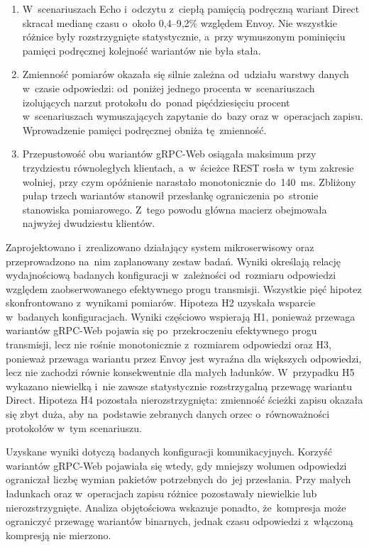 \begin{enumerate}
\item W~scenariuszach Echo i~odczytu z~ciepłą pamięcią podręczną wariant Direct skracał medianę czasu o~około 0,4--9,2\% względem Envoy. Nie wszystkie różnice były rozstrzygnięte statystycznie, a~przy wymuszonym pominięciu pamięci podręcznej kolejność wariantów nie była stała.

\item Zmienność pomiarów okazała się silnie zależna od~udziału warstwy danych w~czasie odpowiedzi: od~poniżej jednego procenta w~scenariuszach izolujących narzut protokołu do~ponad pięćdziesięciu procent w~scenariuszach wymuszających zapytanie do~bazy oraz w~operacjach zapisu. Wprowadzenie pamięci podręcznej obniża tę~zmienność.

\item Przepustowość obu wariantów gRPC-Web osiągała maksimum przy trzydziestu równoległych klientach, a~w~ścieżce REST rosła w~tym zakresie wolniej, przy czym opóźnienie narastało monotonicznie do~140~ms. Zbliżony pułap trzech wariantów stanowił przesłankę ograniczenia po~stronie stanowiska pomiarowego. Z~tego powodu główna macierz obejmowała najwyżej dwudziestu klientów.
\end{enumerate}

Zaprojektowano i~zrealizowano działający system mikroserwisowy oraz przeprowadzono na~nim zaplanowany zestaw badań. Wyniki określają relację wydajnościową badanych konfiguracji w~zależności od~rozmiaru odpowiedzi względem zaobserwowanego efektywnego progu transmisji. Wszystkie pięć hipotez skonfrontowano z~wynikami pomiarów. Hipoteza H2 uzyskała wsparcie w~badanych konfiguracjach. Wyniki częściowo wspierają H1, ponieważ przewaga wariantów gRPC-Web pojawia się po~przekroczeniu efektywnego progu transmisji, lecz nie rośnie monotonicznie z~rozmiarem odpowiedzi oraz H3, ponieważ przewaga wariantu przez Envoy jest wyraźna dla większych odpowiedzi, lecz nie zachodzi równie konsekwentnie dla małych ładunków. W~przypadku H5 wykazano niewielką i~nie zawsze statystycznie rozstrzygalną przewagę wariantu Direct. Hipoteza H4 pozostała nierozstrzygnięta: zmienność ścieżki zapisu okazała się zbyt duża, aby na~podstawie zebranych danych orzec o~równoważności protokołów w~tym scenariuszu.

Uzyskane wyniki dotyczą badanych konfiguracji komunikacyjnych. Korzyść wariantów gRPC-Web pojawiała się wtedy, gdy mniejszy wolumen odpowiedzi ograniczał liczbę wymian pakietów potrzebnych do~jej przesłania. Przy małych ładunkach oraz w~operacjach zapisu różnice pozostawały niewielkie lub nierozstrzygnięte. Analiza objętościowa wskazuje ponadto, że~kompresja może ograniczyć przewagę wariantów binarnych, jednak czasu odpowiedzi z~włączoną kompresją nie mierzono.

